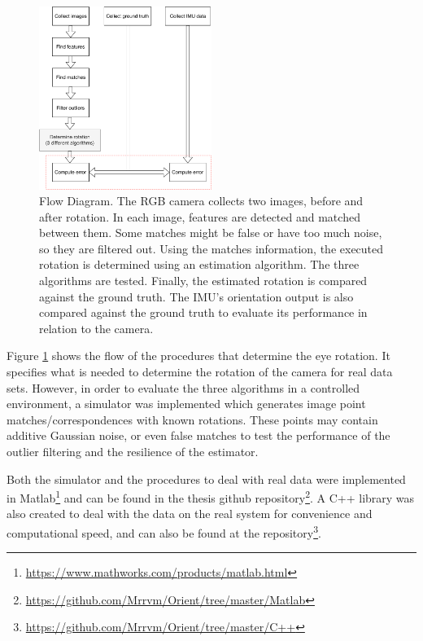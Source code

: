 \begin{figure}[ht]
	\centering
	\includegraphics[width=0.5\textwidth]{images/approach.pdf}
	\caption[Flow Diagram]{Flow Diagram. The RGB camera collects two images, before and after rotation. In each image, features are detected and matched between them. Some matches might be false or have too much noise, so they are filtered out. Using the matches information, the executed rotation is determined using an estimation algorithm. The three algorithms are tested. Finally, the estimated rotation is compared against the ground truth. The IMU's orientation output is also compared against the ground truth to evaluate its performance in relation to the camera.}
	\label{cha3:methodology:approach}
\end{figure}
Figure \ref{cha3:methodology:approach} shows the flow of the procedures that determine the eye rotation. It specifies what is needed to determine the rotation of the camera for real data sets. However, in order to evaluate the three algorithms in a controlled environment, a simulator was implemented which generates image point matches/correspondences with known rotations. These points may contain additive Gaussian noise, or even false matches to test the performance of the outlier filtering and the resilience of the estimator. 

Both the simulator and the procedures to deal with real data were implemented in Matlab\footnote{\href{https://www.mathworks.com/products/matlab.html}{https://www.mathworks.com/products/matlab.html}} and can be found in the thesis github repository\footnote{\href{https://github.com/Mrrvm/Orient/tree/master/Matlab}{https://github.com/Mrrvm/Orient/tree/master/Matlab}}. A C++ library was also created to deal with the data on the real system for convenience and computational speed, and can also be found at the repository\footnote{\href{https://github.com/Mrrvm/Orient/tree/master/C++}{https://github.com/Mrrvm/Orient/tree/master/C++}}.

